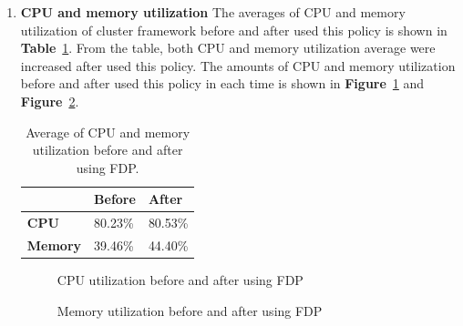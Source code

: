 \documentclass[12pt,oneside,openright,a4paper]{cpe-english-project}
\begin{document}
\begin{enumerate}
\newpage
  \item \textbf{CPU and memory utilization}
  \newline
  The averages of CPU and memory utilization of cluster framework before and after used this policy is shown in \textbf{Table}~\ref{tbl:po1CPUMem}. From the table, both CPU and memory utilization average were increased after used this policy. The amounts of CPU and memory utilization before and after used this policy in each time is shown in \textbf{Figure}~\ref{fig:cpu1} and \textbf{Figure}~\ref{fig:mem1}. 
  \begin{table}[!h]
  \caption{Average of CPU and memory utilization before and after using FDP.}\label{tbl:po1CPUMem}
  \begin{tabular}{@{}|p{}|p{}|p{}|}
   \hline
   \textbf{} & \textbf{Before} & \textbf{After} \\ 
   \hline
   \textbf{CPU} & 80.23\% & 80.53\% \\ 
   \hline
   \textbf{Memory} & 39.46\% & 44.40\% \\ 
   \hline                     
  \end{tabular}
\end{table}
\begin{figure}[!h]\centering
    \setlength{\fboxrule}{0mm} %
    \setlength{\fboxsep}{0cm}
    \caption{CPU utilization before and after using FDP}\label{fig:cpu1}
\end{figure}
\begin{figure}[!h]\centering
    \setlength{\fboxrule}{0mm} %
    \setlength{\fboxsep}{0cm}
    \caption{Memory utilization before and after using FDP}\label{fig:mem1}
\end{figure}


\end{enumerate}
\end{document}
